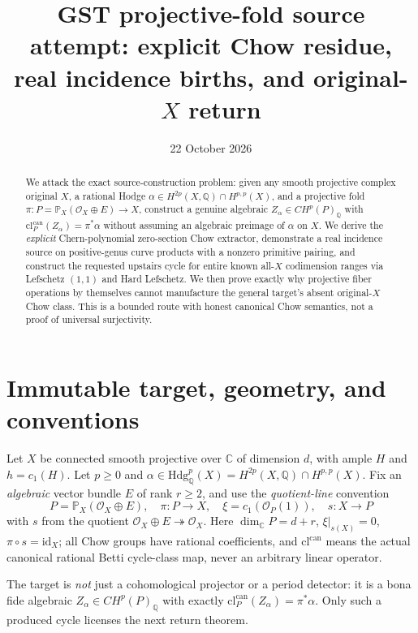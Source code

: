 \documentclass[11pt]{article}
\title{GST projective-fold source attempt: explicit Chow residue, real incidence births, and original-\(X\) return}
\date{22 October 2026}
\begin{document}
\maketitle

\begin{abstract}
We attack the exact source-construction problem:
given any smooth projective complex original \(X\), a rational Hodge
\(\alpha\in H^{2p}(X,\mathbb Q)\cap H^{p,p}(X)\), and a projective
fold \(\pi:P=\mathbb P_X(\mathcal O_X\oplus E)\to X\),
construct a genuine algebraic \(Z_\alpha\in CH^p(P)_{\mathbb Q}\)
with \(\mathrm{cl}_P^{\mathrm{can}}(Z_\alpha)=\pi^*\alpha\)
without assuming an algebraic preimage of \(\alpha\) on \(X\).
We derive the \emph{explicit} Chern-polynomial zero-section
Chow extractor, demonstrate a real incidence source on
positive-genus curve products with a nonzero primitive pairing,
and construct the requested upstairs cycle for entire known
all-\(X\) codimension ranges via Lefschetz \((1,1)\) and Hard Lefschetz.
We then prove exactly why projective fiber operations by themselves
cannot manufacture the general target's absent original-\(X\)
Chow class. This is a bounded route with honest
canonical Chow semantics, not a proof of universal surjectivity.
\end{abstract}

\section{Immutable target, geometry, and conventions}
Let \(X\) be connected smooth projective over \(\mathbb C\) of
dimension \(d\), with ample \(H\) and \(h=c_1(H)\).
Let \(p\ge0\) and
\(\alpha\in\mathrm{Hdg}_{\mathbb Q}^p(X)
=H^{2p}(X,\mathbb Q)\cap H^{p,p}(X)\).
Fix an \emph{algebraic} vector bundle \(E\) of rank \(r\ge2\),
and use the \emph{quotient-line} convention
\[
 P=\mathbb P_X(\mathcal O_X\oplus E),\quad
 \pi:P\longrightarrow X,\quad
 \xi=c_1(\mathcal O_P(1)),\quad
 s:X\longrightarrow P
\]
with \(s\) from the quotient
\(\mathcal O_X\oplus E\twoheadrightarrow\mathcal O_X\).
Here \(\dim_{\mathbb C}P=d+r\),
\(\xi|_{s(X)}=0\), \(\pi\circ s=\mathrm{id}_X\);
all Chow groups have rational coefficients, and
\(\mathrm{cl}^{\mathrm{can}}\) means the actual canonical
rational Betti cycle-class map, never an arbitrary linear operator.

The target is \emph{not} just a cohomological projector or
a period detector: it is a bona fide algebraic
\(Z_\alpha\in CH^p(P)_{\mathbb Q}\) with exactly
\(\mathrm{cl}^{\mathrm{can}}_P(Z_\alpha)=\pi^*\alpha\).
Only such a produced cycle licenses the next return theorem.
\end{document}
